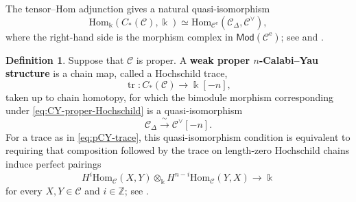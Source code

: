 \documentclass[11pt,letterpaper,reqno]{amsart}
\theoremstyle{plain}
\theoremstyle{definition}
\newtheorem{definition}[definition]{Definition}
\theoremstyle{plain}
\theoremstyle{definition}
\numberwithin{equation}{section}
\begin{document}
The tensor--Hom adjunction gives a natural quasi-isomorphism
\begin{equation}\label{eq:CY-proper-Hochschild}
\mathrm{Hom}_{\Bbbk}(C_*(\mathscr C),\Bbbk)
\simeq\mathrm{Hom}_{\mathscr C^{\mathrm e}}(\mathscr C_\Delta,\mathscr C^\vee),
\end{equation}
where the right-hand side is the morphism complex in $\mathsf{Mod}(\mathscr C^{\mathrm e})$; see \cite[Section 3.1]{Brav-Dyckerhoff2019} and \cite[Remark 6.2]{Ganatra2023}.

\begin{definition}\label{def:weak-proper-CY}
Suppose that $\mathscr C$ is proper.
A \textbf{weak proper $n$-Calabi--Yau structure} is a chain map, called a Hochschild trace,
\begin{equation}\label{eq:pCY-trace}
\operatorname{tr}:C_*(\mathscr C)\longrightarrow\Bbbk[-n],
\end{equation}
taken up to chain homotopy, for which the bimodule morphism corresponding under \eqref{eq:CY-proper-Hochschild} is a quasi-isomorphism
\begin{equation}\label{eq:pCY-map}
\mathscr C_\Delta\xrightarrow{\,\sim\,}\mathscr C^\vee[-n].
\end{equation}
For a trace as in \eqref{eq:pCY-trace}, this quasi-isomorphism condition is equivalent to requiring that composition followed by the trace on length-zero Hochschild chains induce perfect pairings
\begin{equation}\label{eq:CY-pairing}
H^i\mathrm{Hom}_{\mathscr C}(X,Y)\otimes_{\Bbbk}
H^{n-i}\mathrm{Hom}_{\mathscr C}(Y,X)\longrightarrow\Bbbk
\end{equation}
for every $X,Y\in\mathscr C$ and $i\in\mathbb Z$; see \cite[Definition 6.1 and Remark 6.2]{Ganatra2023}.
\end{definition}
\end{document}
